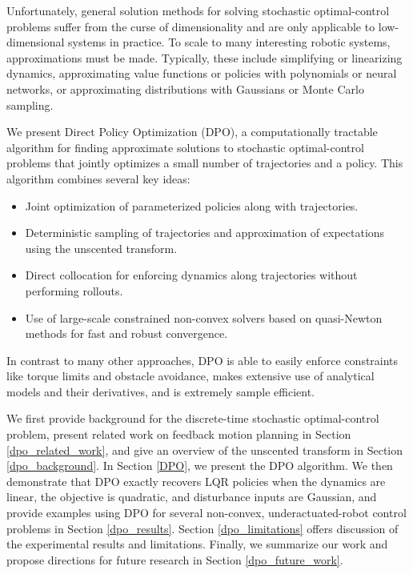 Unfortunately, general solution methods for solving stochastic optimal-control problems suffer from the curse of dimensionality and are only applicable to low-dimensional systems in practice. To scale to many interesting robotic systems, approximations must be made. Typically, these include simplifying or linearizing dynamics, approximating value functions or policies with polynomials or neural networks, or approximating distributions with Gaussians or Monte Carlo sampling.

We present Direct Policy Optimization (DPO), a computationally tractable algorithm for finding approximate solutions to stochastic optimal-control problems that jointly optimizes a small number of trajectories and a policy. This algorithm combines several key ideas:

\begin{itemize}
	\item Joint optimization of parameterized policies along with trajectories.
	\item Deterministic sampling of trajectories and approximation of expectations using the unscented transform.
	\item Direct collocation for enforcing dynamics along trajectories without performing rollouts.
	\item Use of large-scale constrained non-convex solvers based on quasi-Newton methods for fast and robust convergence.
\end{itemize}

In contrast to many other approaches, DPO is able to easily enforce constraints like torque limits and obstacle avoidance, makes extensive use of analytical models and their derivatives, and is extremely sample efficient.

We first provide background for the discrete-time stochastic optimal-control problem, present related work on feedback motion planning in Section \ref{dpo_related_work}, and give an overview of the unscented transform in Section \ref{dpo_background}. In Section \ref{DPO}, we present the DPO algorithm. We then demonstrate that DPO exactly recovers LQR policies when the dynamics are linear, the objective is quadratic, and disturbance inputs are Gaussian, and provide examples using DPO for several non-convex, underactuated-robot control problems in Section \ref{dpo_results}. Section \ref{dpo_limitations} offers discussion of the experimental results and limitations. Finally, we summarize our work and propose directions for future research in Section \ref{dpo_future_work}.

